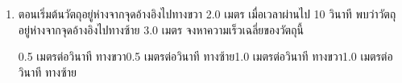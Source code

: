 \begin{enumerate}
	\item \runningj  \nonet ตอนเริ่มต้นวัตถุอยู่ห่างจากจุดอ้างอิงไปทางขวา  2.0  เมตร   เมื่อเวลาผ่านไป  10  	วินาที   พบว่าวัตถุอยู่ห่างจากจุดอ้างอิงไปทางซ้าย   3.0  เมตร  จงหาความเร็วเฉลี่ยของวัตถุนี้ 
	\begin{2c}
		{0.5  เมตรต่อวินาที 	 ทางขวา}{0.5  เมตรต่อวินาที  ทางซ้าย}{1.0  เมตรต่อวินาที 	 ทางขวา}{1.0  เมตรต่อวินาที  ทางซ้าย}
	\end{2c}
\end{enumerate}
